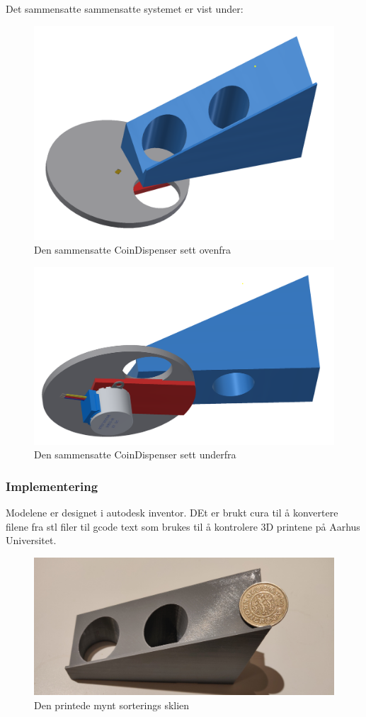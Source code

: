 \documentclass[HardwareDesign/HardwareDesign_main.tex]{subfiles}
\begin{document}
Det sammensatte sammensatte systemet er vist under:
\begin{figure}[H]
    \centering
    \includegraphics[width=1\linewidth]{Rapport/BallDispenser/CoinDispenser/graphics/coinmaster.png}
    \caption{Den sammensatte CoinDispenser sett ovenfra}
\end{figure}

\begin{figure}[H]
    \centering
    \includegraphics[width=1\linewidth]{Rapport/BallDispenser/CoinDispenser/graphics/coinmaster-under.png}
    \caption{Den sammensatte CoinDispenser sett underfra}
\end{figure}

\subsubsection{Implementering}
Modelene er designet i autodesk inventor. DEt er brukt cura til å konvertere filene fra stl filer til gcode text som brukes til å kontrolere 3D printene på Aarhus Universitet.

\begin{figure}[H]
    \centering
    \includegraphics[width=\linewidth]{Modultest/CoinDispenser/CoinHardwareModulTest/Graphic/CoinHardwareTestSetup.jpg}
    \caption{Den printede mynt sorterings sklien}
\end{figure}
\end{document}
